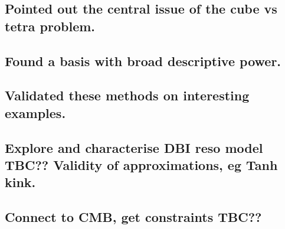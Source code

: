     \subsection{Pointed out the central issue of the cube vs tetra problem.}
    \subsection{Found a basis with broad descriptive power.}
    \subsection{Validated these methods on interesting examples.}
    \subsection{Explore and characterise DBI reso model TBC?? Validity of approximations, eg Tanh kink.}
    \subsection{Connect to CMB, get constraints TBC??}

